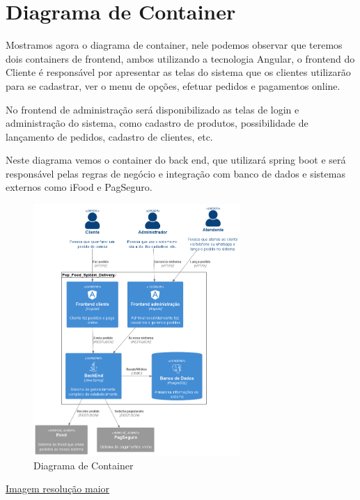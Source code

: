   \section{Diagrama de Container}
  Mostramos agora o diagrama de container, nele podemos observar que teremos dois containers de frontend,
  ambos utilizando a tecnologia Angular, o frontend do Cliente é responsável por apresentar as telas do sistema
  que os clientes utilizarão para se cadastrar, ver o menu de opções, efetuar pedidos e pagamentos online.

  No frontend de administração será disponibilizado as telas de login e administração do sistema, como cadastro de produtos, possibilidade de lançamento de pedidos,
  cadastro de clientes, etc.

  Neste diagrama vemos o container do back end, que utilizará spring boot e será responsável pelas regras de negócio e integração com banco de dados e sistemas externos como iFood e PagSeguro.

  \begin{figure}[h]
    \centering
    \includegraphics[width=0.7\textwidth]{diagrama_container.png}
    \caption{Diagrama de Container}
    \label{fig:Diagrama de Container}
  \end{figure}

  \href{https://github.com/soltein/TCC/blob/main/Diagramas/out/diagrama_container/diagrama_container.png}{Imagem resolução maior}




